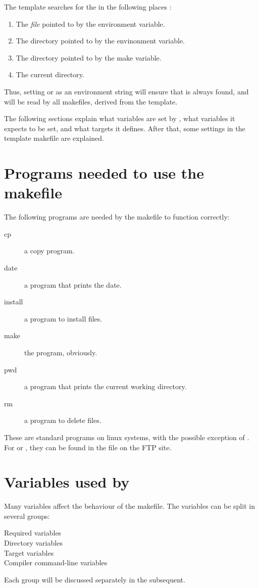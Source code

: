 \documentclass{report}
\begin{document}
The template  searches for the  in  the
following places :
\begin{enumerate}
\item The {\em file} pointed to by the  environment variable.
\item The directory pointed to by the  envinonment variable.
\item The directory pointed to by the  make variable.
\item The current directory.
\end{enumerate}
Thus, setting  or  as an environment string will
ensure that  is always found, and will be read by all
makefiles, derived from the template.

The following sections explain what variables are set by ,
what variables it expects to be set, and what targets it defines. After
that, some settings in the template makefile are explained.

\section{Programs needed to use the makefile}

The following programs are needed by the makefile to function correctly:
\begin{description}
\item[cp] a copy program.
\item[date] a program that prints the date.
\item[install] a program to install files.
\item[make] the  program, obviously.
\item[pwd] a program that prints the current working directory.
\item[rm] a program to delete files.
\end{description}
These are standard programs on linux systems, with the possible exception of
. For \dos or \windowsnt, they can be found in the
file  on the \fpc FTP site.

\section{Variables used by }

Many variables affect the behaviour of the makefile.  The variables can be
split in several groups:
\begin{description}
\item[Required variables]
\item[Directory variables]
\item[Target variables]
\item[Compiler command-line variables]
\end{description}
Each group will be discussed separately in the subsequent.
\end{document}
